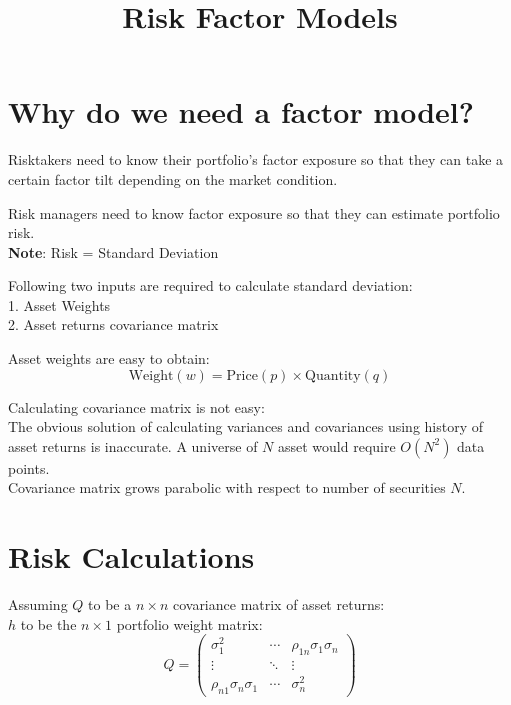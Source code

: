 \documentclass{article}
\begin{document}
\title{Risk Factor Models}
\author{}
\date{}
\maketitle

\section*{Why do we need a factor model?}
Risktakers need to know their portfolio's factor exposure so that they can take a certain factor tilt depending on the market condition.

Risk managers need to know factor exposure so that they can estimate portfolio risk. \\
\textbf{Note}: Risk = Standard Deviation

Following two inputs are required to calculate standard deviation: \\
1. Asset Weights \\
2. Asset returns covariance matrix

Asset weights are easy to obtain: 
\begin{equation}
    \text{Weight}(w) = \text{Price}(p) \times \text{Quantity}(q)
\end{equation}

Calculating covariance matrix is not easy: \\
The obvious solution of calculating variances and covariances using history of asset returns is inaccurate. A universe of \( N \) asset would require \( O(N^2) \) data points. \\
Covariance matrix grows parabolic with respect to number of securities \( N \). \\

\section*{Risk Calculations}
Assuming \( Q \) to be a \( n \times n \) covariance matrix of asset returns: \\
\( h \) to be the \( n \times 1 \) portfolio weight matrix:
\begin{equation}
Q = \begin{pmatrix}
\sigma_1^2 & \cdots & \rho_{1n}\sigma_1\sigma_n \\
\vdots & \ddots & \vdots \\
\rho_{n1}\sigma_n\sigma_1 & \cdots & \sigma_n^2
\end{pmatrix}
\end{equation}
\end{document}
